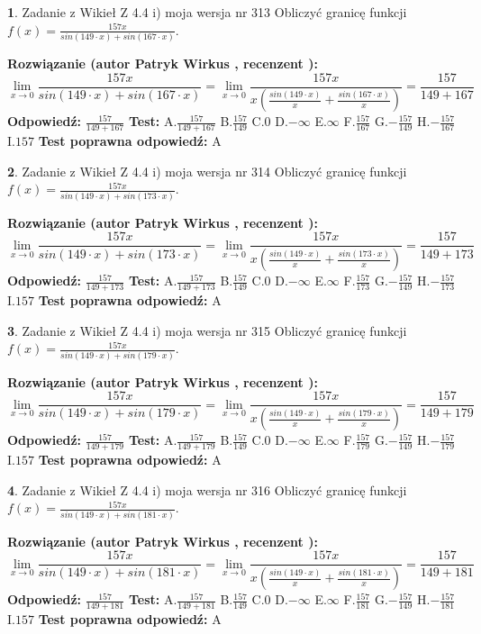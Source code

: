 \documentclass[12pt, a4paper]{article}
\theoremstyle{definition} %
\newtheorem{zad}{}
\newcommand{\zadStart}[1]{\begin{zad}#1\newline}
\newcommand{\zadStop}{\end{zad}}
\newcommand{\rozwStart}[2]{\noindent \textbf{Rozwiązanie (autor #1 , recenzent #2): }\newline}
\newcommand{\rozwStop}{\newline}
\newcommand{\odpStart}{\noindent \textbf{Odpowiedź:}\newline}
\newcommand{\odpStop}{\newline}
\newcommand{\testStart}{\noindent \textbf{Test:}\newline}
\newcommand{\testStop}{\newline}
\newcommand{\kluczStart}{\noindent \textbf{Test poprawna odpowiedź:}\newline}
\newcommand{\kluczStop}{\newline}
\begin{document}
\zadStart{Zadanie z Wikieł Z 4.4 i) moja wersja nr 313}
Obliczyć granicę funkcji $f(x)=\frac{157x}{sin(149\cdot x) +sin(167\cdot x)}$.
\zadStop
\rozwStart{Patryk Wirkus}{}
$$\lim\limits_{x\to 0}\frac{157x}{sin(149\cdot x) +sin(167\cdot x)}=\lim\limits_{x\to 0}\frac{157x}{x(\frac{sin(149\cdot x)}{x}+\frac{sin(167\cdot x)}{x})}=\frac{157}{149+167}$$
\rozwStop
\odpStart
$\frac{157}{149+167}$
\odpStop
\testStart
A.$\frac{157}{149+167}$
B.$\frac{157}{149}$
C.$0$
D.$-\infty$
E.$\infty$
F.$\frac{157}{167}$
G.$-\frac{157}{149}$
H.$-\frac{157}{167}$
I.$157$
\testStop
\kluczStart
A
\kluczStop



\zadStart{Zadanie z Wikieł Z 4.4 i) moja wersja nr 314}
Obliczyć granicę funkcji $f(x)=\frac{157x}{sin(149\cdot x) +sin(173\cdot x)}$.
\zadStop
\rozwStart{Patryk Wirkus}{}
$$\lim\limits_{x\to 0}\frac{157x}{sin(149\cdot x) +sin(173\cdot x)}=\lim\limits_{x\to 0}\frac{157x}{x(\frac{sin(149\cdot x)}{x}+\frac{sin(173\cdot x)}{x})}=\frac{157}{149+173}$$
\rozwStop
\odpStart
$\frac{157}{149+173}$
\odpStop
\testStart
A.$\frac{157}{149+173}$
B.$\frac{157}{149}$
C.$0$
D.$-\infty$
E.$\infty$
F.$\frac{157}{173}$
G.$-\frac{157}{149}$
H.$-\frac{157}{173}$
I.$157$
\testStop
\kluczStart
A
\kluczStop



\zadStart{Zadanie z Wikieł Z 4.4 i) moja wersja nr 315}
Obliczyć granicę funkcji $f(x)=\frac{157x}{sin(149\cdot x) +sin(179\cdot x)}$.
\zadStop
\rozwStart{Patryk Wirkus}{}
$$\lim\limits_{x\to 0}\frac{157x}{sin(149\cdot x) +sin(179\cdot x)}=\lim\limits_{x\to 0}\frac{157x}{x(\frac{sin(149\cdot x)}{x}+\frac{sin(179\cdot x)}{x})}=\frac{157}{149+179}$$
\rozwStop
\odpStart
$\frac{157}{149+179}$
\odpStop
\testStart
A.$\frac{157}{149+179}$
B.$\frac{157}{149}$
C.$0$
D.$-\infty$
E.$\infty$
F.$\frac{157}{179}$
G.$-\frac{157}{149}$
H.$-\frac{157}{179}$
I.$157$
\testStop
\kluczStart
A
\kluczStop



\zadStart{Zadanie z Wikieł Z 4.4 i) moja wersja nr 316}
Obliczyć granicę funkcji $f(x)=\frac{157x}{sin(149\cdot x) +sin(181\cdot x)}$.
\zadStop
\rozwStart{Patryk Wirkus}{}
$$\lim\limits_{x\to 0}\frac{157x}{sin(149\cdot x) +sin(181\cdot x)}=\lim\limits_{x\to 0}\frac{157x}{x(\frac{sin(149\cdot x)}{x}+\frac{sin(181\cdot x)}{x})}=\frac{157}{149+181}$$
\rozwStop
\odpStart
$\frac{157}{149+181}$
\odpStop
\testStart
A.$\frac{157}{149+181}$
B.$\frac{157}{149}$
C.$0$
D.$-\infty$
E.$\infty$
F.$\frac{157}{181}$
G.$-\frac{157}{149}$
H.$-\frac{157}{181}$
I.$157$
\testStop
\kluczStart
A
\kluczStop
\end{document}
